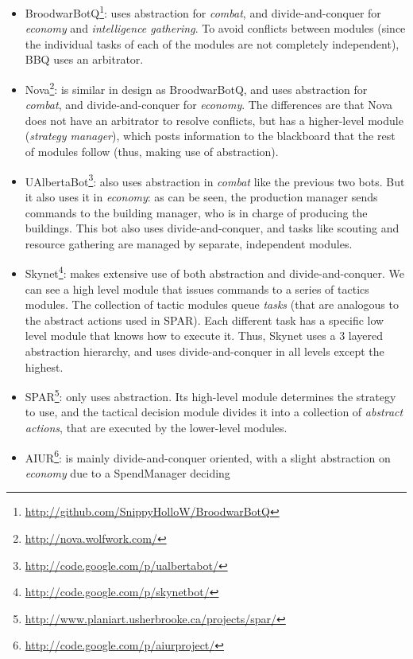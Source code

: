 \documentclass[journal]{IEEEtran}
\begin{document}
\begin{itemize}
\item
  BroodwarBotQ\footnote{\url{http://github.com/SnippyHolloW/BroodwarBotQ}}:
  uses  abstraction for  {\em combat}, and  divide-and-conquer for
  {\em economy}  and  {\em intelligence  gathering}. To  avoid  conflicts
  between modules (since  the individual tasks of each  of the modules
  are not completely independent), BBQ uses an arbitrator.
\item  Nova\footnote{\url{http://nova.wolfwork.com/}}:  is similar  in
  design as  BroodwarBotQ, and uses  abstraction for {\em combat},
  and  divide-and-conquer for  {\em economy}.  The differences  are
  that Nova does not have  an arbitrator to resolve conflicts, but has
  a  higher-level   module  ({\em  strategy   manager}),  which  posts
  information to the blackboard that the rest of modules follow (thus,
  making use of abstraction).
\item
  UAlbertaBot\footnote{\url{http://code.google.com/p/ualbertabot/}}:
  also  uses abstraction  in  {\em combat} like  the previous  two
  bots. But it  also uses it in {\em economy}: as  can be seen, the
  production manager sends commands to the building manager, who is in
  charge   of   producing   the   buildings.  This   bot   also   uses
  divide-and-conquer, and  tasks like scouting  and resource gathering
  are managed by separate, independent modules.
\item       Skynet\footnote{\url{http://code.google.com/p/skynetbot/}}:
  makes     extensive     use      of     both     abstraction     and
  divide-and-conquer.  We  can see a  high level module  that issues commands  to a
  series of  tactics modules. The  collection of tactic  modules queue
  {\em  tasks} (that  are analogous  to the  abstract actions  used in
  SPAR).  Each different  task has  a specific  low level  module that
  knows how to  execute it. Thus, Skynet uses  a 3 layered abstraction
  hierarchy,  and uses  divide-and-conquer  in all  levels except  the
  highest.
\item
  SPAR\footnote{\url{http://www.planiart.usherbrooke.ca/projects/spar/}}:
  only uses abstraction. Its high-level module determines the strategy
  to  use,  and  the  tactical  decision  module  divides  it  into  a
  collection  of {\em  abstract  actions}, that  are  executed by  the
  lower-level modules.
\item  AIUR\footnote{\url{http://code.google.com/p/aiurproject/}}:  is
  mainly divide-and-conquer oriented,
  with a  slight abstraction on  {\em economy} due to a  SpendManager deciding

\end{itemize}
\end{document}
